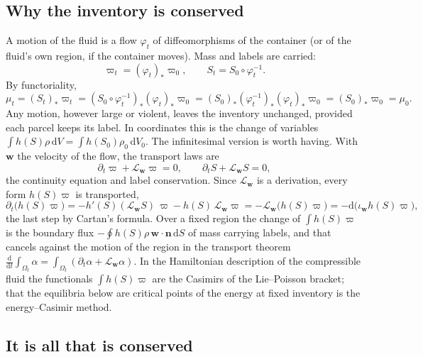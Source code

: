 \documentclass[11pt]{article}
\theoremstyle{definition}
\theoremstyle{remark}
\newcommand{\bw}{\mathbf{w}}
\newcommand{\bn}{\mathbf{n}}
\newcommand{\dS}{\,\mathrm{d}S}
\newcommand{\dV}{\,\mathrm{d}V}
\begin{document}
\subsection{Why the inventory is conserved}

A motion of the fluid is a flow $\varphi_t$ of diffeomorphisms of the
container (or of the fluid's own region, if the container moves). Mass
and labels are carried:
\begin{equation*}
  \varpi_t = (\varphi_t)_*\varpi_0,\qquad S_t = S_0\circ\varphi_t^{-1} .
\end{equation*}
By functoriality,
\begin{equation}
  \mu_t = (S_t)_*\varpi_t
  = (S_0\circ\varphi_t^{-1})_*(\varphi_t)_*\varpi_0
  = (S_0)_*(\varphi_t^{-1})_*(\varphi_t)_*\varpi_0
  = (S_0)_*\varpi_0 = \mu_0 .
  \label{eq:functorial}
\end{equation}
Any motion, however large or violent, leaves the inventory unchanged,
provided each parcel keeps its label. In coordinates this is the
change of variables $\int h(S)\rho\dV = \int h(S_0)\rho_0\,\mathrm
dV_0$. The infinitesimal version is worth having. With $\bw$ the
velocity of the flow, the transport laws are
\begin{equation}
  \partial_t\varpi + \mathcal L_{\bw}\varpi = 0,
  \qquad
  \partial_tS + \mathcal L_{\bw}S = 0 ,
  \label{eq:transport}
\end{equation}
the continuity equation and label conservation. Since $\mathcal
L_{\bw}$ is a derivation, every form $h(S)\varpi$ is transported,
\begin{equation*}
  \partial_t\bigl(h(S)\varpi\bigr)
  = -h'(S)(\mathcal L_{\bw}S)\,\varpi - h(S)\,\mathcal L_{\bw}\varpi
  = -\mathcal L_{\bw}\bigl(h(S)\varpi\bigr)
  = -\mathrm d\bigl(\iota_{\bw}h(S)\varpi\bigr),
\end{equation*}
the last step by Cartan's formula. Over a fixed region the change of
$\int h(S)\varpi$ is the boundary flux $-\oint h(S)\rho\,\bw\cdot\bn\dS$
of mass carrying labels, and that cancels against the motion of the
region in the transport theorem $\frac{\mathrm d}{\mathrm
dt}\int_{\Omega_t}\alpha = \int_{\Omega_t}(\partial_t\alpha +
\mathcal L_{\bw}\alpha)$. In the Hamiltonian description of the
compressible fluid the functionals $\int h(S)\varpi$ are the Casimirs
of the Lie--Poisson bracket; that the equilibria below are critical
points of the energy at fixed inventory is the energy--Casimir method.

\subsection{It is all that is conserved}
\label{sec:allconserved}
\end{document}

